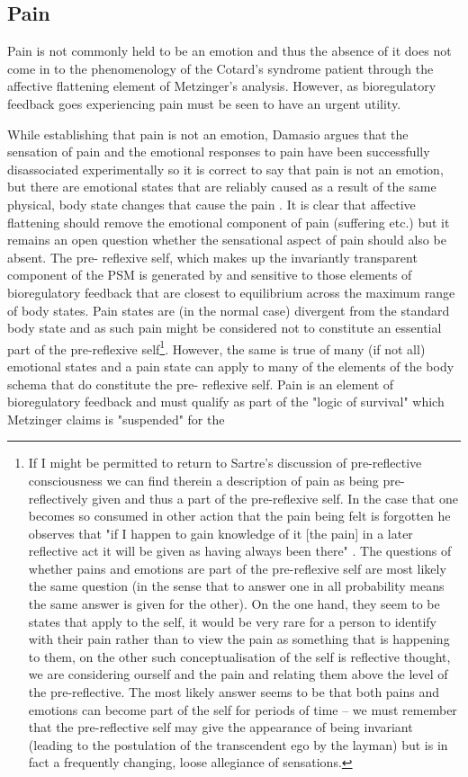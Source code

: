 \subsection{Pain}

Pain is not commonly held to be an emotion \cite[p. 71]{damasio2000} and thus the absence of it does not come in to the phenomenology of the Cotard's syndrome patient through the affective flattening element of Metzinger's analysis. However, as bioregulatory feedback goes experiencing pain must be seen to have an urgent utility.

While establishing that pain is not an emotion, Damasio argues that the sensation of pain and the emotional responses to pain have been successfully disassociated experimentally so it is correct to say that pain is not an emotion, but there are emotional states that are reliably caused as a result of the same physical, body state changes that cause the pain \cite[p. 75]{damasio2000}. It is clear that affective flattening should remove the emotional component of pain (suffering etc.) but it remains an open question whether the sensational aspect of pain should also be absent. The pre- reflexive self, which makes up the invariantly transparent component of the PSM is generated by and sensitive to those elements of bioregulatory feedback that are closest to equilibrium across the maximum range of body states. Pain states are (in the normal case) divergent from the standard body state and as such pain might be considered not to constitute an essential part of the pre-reflexive self\footnote{If I might be permitted to return to Sartre's discussion of pre-reflective consciousness we can find therein a description of pain as being pre-reflectively given and thus a part of the pre-reflexive self. In the case that one becomes so consumed in other action that the pain being felt is forgotten he observes that "if I happen to gain knowledge of it [the pain] in a later reflective act it will be given as having always been there" \cite[p. 437]{sartre1956}. The questions of whether pains and emotions are part of the pre-reflexive self are most likely the same question (in the sense that to answer one in all probability means the same answer is given for the other). On the one hand, they seem to be states that apply to the self, it would be very rare for a person to identify with their pain rather than to view the pain as something that is happening to them, on the other such conceptualisation of the self is reflective thought, we are considering ourself and the pain and relating them above the level of the pre-reflective. The most likely answer seems to be that both pains and emotions can become part of the self for periods of time – we must remember that the pre-reflective self may give the appearance of being invariant (leading to the postulation of the transcendent ego by the layman) but is in fact a frequently changing, loose allegiance of sensations.}. However, the same is true of many (if not all) emotional states and a pain state can apply to many of the elements of the body schema that do constitute the pre- reflexive self. Pain is an element of bioregulatory feedback and must qualify as part of the "logic of survival" which Metzinger claims is "suspended" \cite[p. 459]{metzinger2003} for the 